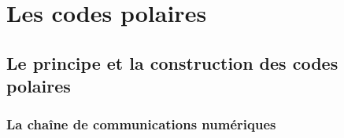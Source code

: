 
\chapter{Les codes polaires}

\vspace*{\fill}
\minitocTITI
\vspace*{\fill}

\section{Le principe et la construction des codes polaires}

\subsection{La chaîne de communications numériques}
\label{subsec:contexte}


